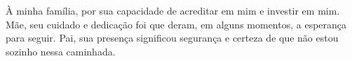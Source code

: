 À minha família, por sua capacidade de acreditar em mim e investir em mim. Mãe, seu cuidado e dedicação foi que deram, em alguns momentos, a esperança para seguir. Pai, sua presença significou segurança e certeza de que não estou sozinho nessa caminhada.